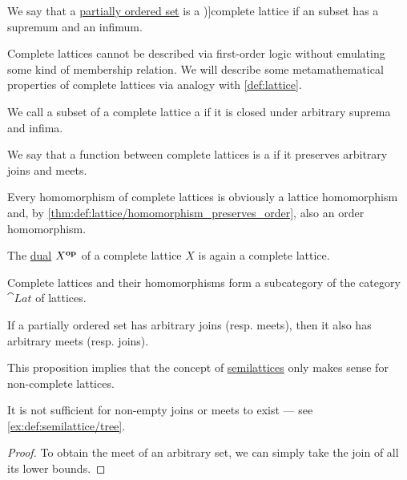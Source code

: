 \begin{definition}\label{def:complete_lattice}
  We say that a \hyperref[def:partially_ordered_set]{partially ordered set} is a \term[ru=полная (решётка) (\cite[133]{Гуров2013ТеорияРешёток})]{complete lattice} if an  subset has a supremum and an infimum.

  Complete lattices cannot be described via first-order logic without emulating some kind of membership relation. We will describe some metamathematical properties of complete lattices via analogy with \cref{def:lattice}.
  \begin{thmenum}
     We call a subset of a complete lattice a  if it is closed under arbitrary suprema and infima.

    \mimprovised We say that a function between complete lattices is a  if it preserves arbitrary joins and meets.

    Every homomorphism of complete lattices is obviously a lattice homomorphism and, by \cref{thm:def:lattice/homomorphism_preserves_order}, also an order homomorphism.

     The \hyperref[def:preordered_set/opposite]{dual} \( X^\oppos \) of a complete lattice \( X \) is again a complete lattice.

     Complete lattices and their homomorphisms form a subcategory of the category \( \cat{Lat} \) of lattices.
  \end{thmenum}
\end{definition}

\begin{proposition}\label{thm:complete_semilattice}
  If a partially ordered set has arbitrary joins (resp. meets), then it also has arbitrary meets (resp. joins).
\end{proposition}
\begin{comments}
  \item This proposition implies that the concept of \hyperref[def:semilattice]{semilattices} only makes sense for non-complete lattices.

  \item It is not sufficient for non-empty joins or meets to exist --- see \cref{ex:def:semilattice/tree}.
\end{comments}
\begin{proof}
  To obtain the meet of an arbitrary set, we can simply take the join of all its lower bounds.
\end{proof}

